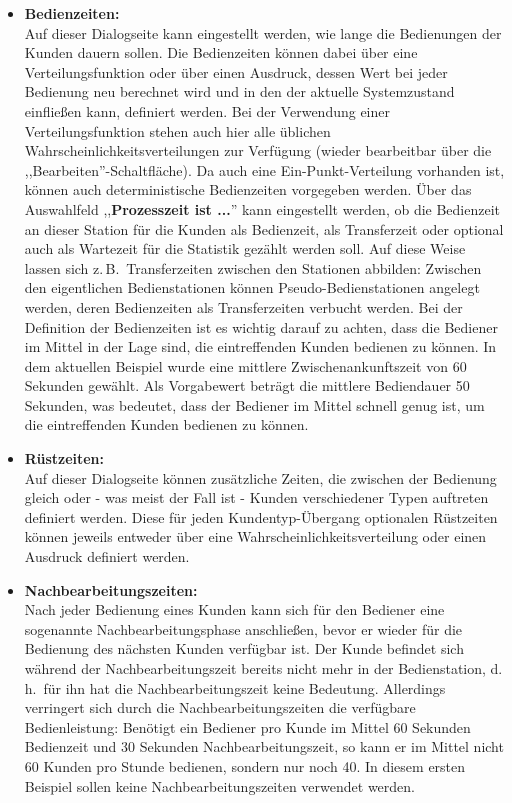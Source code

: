 \documentclass[deutsch]{svmono}
\begin{document}
\begin{itemize}
\item
\textbf{Bedienzeiten:}\\
Auf dieser Dialogseite kann eingestellt werden, wie lange die Bedienungen der Kunden dauern sollen. Die Bedienzeiten können dabei über eine Verteilungsfunktion oder über einen Ausdruck, dessen Wert bei jeder Bedienung neu berechnet wird und in den der aktuelle Systemzustand einfließen kann, definiert werden. Bei der Verwendung einer Verteilungsfunktion stehen auch hier alle üblichen Wahrscheinlichkeitsverteilungen zur Verfügung (wieder bearbeitbar über die ,,Bearbeiten''-Schaltfläche). Da auch eine Ein-Punkt-Verteilung vorhanden ist, können auch deterministische Bedienzeiten vorgegeben werden. Über das Auswahlfeld ,,\textbf{Prozesszeit ist ...}'' kann eingestellt werden, ob die Bedienzeit an dieser Station für die Kunden als Bedienzeit, als Transferzeit oder optional auch als Wartezeit für die Statistik gezählt werden soll. Auf diese Weise lassen sich z.\,B.\ Transferzeiten zwischen den Stationen abbilden: Zwischen den eigentlichen Bedienstationen können Pseudo-Bedienstationen angelegt werden, deren Bedienzeiten als Transferzeiten verbucht werden.
Bei der Definition der Bedienzeiten ist es wichtig darauf zu achten, dass die Bediener im Mittel in der Lage sind, die eintreffenden Kunden bedienen zu können. In dem aktuellen Beispiel wurde eine mittlere Zwischenankunftszeit von 60 Sekunden gewählt. Als Vorgabewert beträgt die mittlere Bediendauer 50 Sekunden, was bedeutet, dass der Bediener im Mittel schnell genug ist, um die eintreffenden Kunden bedienen zu können.
\item
\textbf{Rüstzeiten:}\\
Auf dieser Dialogseite können zusätzliche Zeiten, die zwischen der Bedienung gleich oder - was meist der Fall ist - Kunden verschiedener Typen auftreten definiert werden. Diese für jeden Kundentyp-Übergang optionalen Rüstzeiten können jeweils entweder über eine Wahrscheinlichkeitsverteilung oder einen Ausdruck definiert werden.
\item
\textbf{Nachbearbeitungszeiten:}\\
Nach jeder Bedienung eines Kunden kann sich für den Bediener eine sogenannte Nachbearbeitungsphase anschließen, bevor er wieder für die Bedienung des nächsten Kunden verfügbar ist. Der Kunde befindet sich während der Nachbearbeitungszeit bereits nicht mehr in der Bedienstation, d.\,h.\ für ihn hat die Nachbearbeitungszeit keine Bedeutung. Allerdings verringert sich durch die Nachbearbeitungszeiten die verfügbare Bedienleistung: Benötigt ein Bediener pro Kunde im Mittel 60 Sekunden Bedienzeit und 30 Sekunden Nachbearbeitungszeit, so kann er im Mittel nicht 60 Kunden pro Stunde bedienen, sondern nur noch 40. In diesem ersten Beispiel sollen keine Nachbearbeitungszeiten verwendet werden.

\end{itemize}
\end{document}
